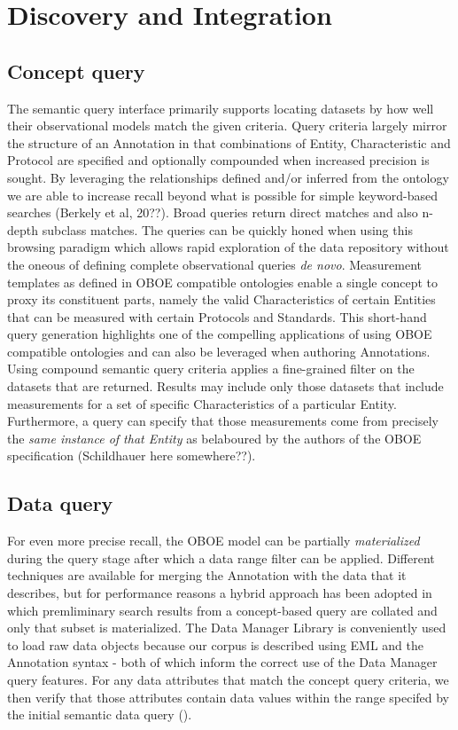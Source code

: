 
\section{Discovery and Integration}
\label{sec:application}

\subsection{Concept query}
The semantic query interface primarily supports locating datasets by how well their observational models match the given criteria. Query criteria largely mirror the structure of an Annotation in that combinations of Entity, Characteristic and Protocol are specified and optionally compounded when increased precision is sought. 
By leveraging the relationships defined and/or inferred from the ontology we are able to increase recall beyond what is possible for simple keyword-based searches (Berkely et al, 20??). Broad queries return direct matches and also n-depth subclass matches. The queries can be quickly honed when using this browsing paradigm which allows rapid exploration of the data repository without the oneous of defining complete observational queries \emph{de novo}. Measurement templates as defined in OBOE compatible ontologies enable a single concept to proxy its constituent parts, namely the valid Characteristics of certain Entities that can be measured with certain Protocols and Standards. This short-hand query generation highlights one of the compelling applications of using OBOE compatible ontologies and can also be leveraged when authoring Annotations.
Using compound semantic query criteria applies a fine-grained filter on the datasets that are returned. Results may include only those datasets that include measurements for a set of specific Characteristics of a particular Entity. Furthermore, a query can specify that those measurements come from precisely the \emph{same instance of that Entity} as belaboured by the authors of the OBOE specification (Schildhauer here somewhere??).

\subsection{Data query}
For even more precise recall, the OBOE model can be partially \emph{materialized} during the query stage after which a data range filter can be applied. Different techniques are available for merging the Annotation with the data that it describes, but for performance reasons a hybrid approach has been adopted in which premliminary search results from a concept-based query are collated and only that subset is materialized. The Data Manager Library is conveniently used to load raw data objects because our corpus is described using EML and the Annotation syntax - both of which inform the correct use of the Data Manager query features. For any data attributes that match the concept query criteria, we then verify that those attributes contain data values within the range specifed by the initial semantic data query ().

